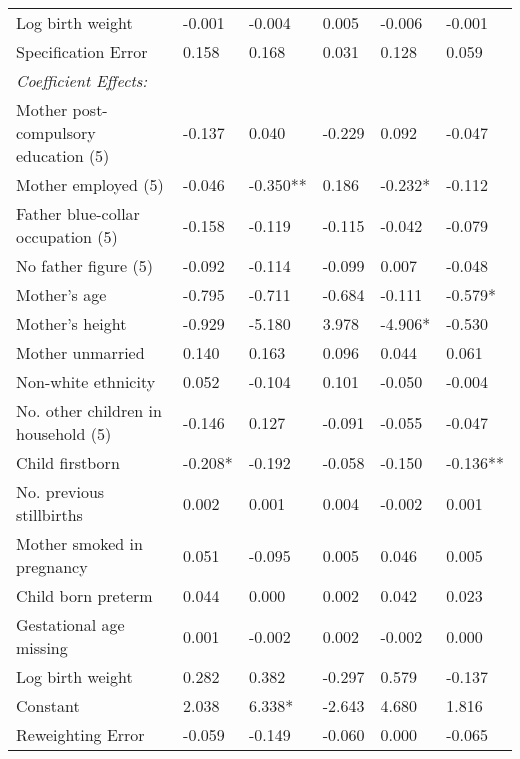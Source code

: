 \begin{table}[htbp]
\begin{tabular}{L{.3\textwidth}C{.085\textwidth}C{.085\textwidth}C{.085\textwidth}C{.085\textwidth}C{.085\textwidth}}
    Log birth weight & -0.001 & -0.004 & 0.005 & -0.006 & -0.001 \\
    Specification Error & 0.158 & 0.168 & 0.031 & 0.128 & 0.059 \\
    \textit{Coefficient Effects:} &       &       &       &       &  \\
    Mother post-compulsory education (5) & -0.137 & 0.040 & -0.229 & 0.092 & -0.047 \\
    Mother employed (5) & -0.046 & -0.350** & 0.186 & -0.232* & -0.112 \\
    Father blue-collar occupation (5) & -0.158 & -0.119 & -0.115 & -0.042 & -0.079 \\
    No father figure (5) & -0.092 & -0.114 & -0.099 & 0.007 & -0.048 \\
    Mother's age & -0.795 & -0.711 & -0.684 & -0.111 & -0.579* \\
    Mother's height & -0.929 & -5.180 & 3.978 & -4.906* & -0.530 \\
    Mother unmarried & 0.140 & 0.163 & 0.096 & 0.044 & 0.061 \\
    Non-white ethnicity & 0.052 & -0.104 & 0.101 & -0.050 & -0.004 \\
    No. other children in household (5) & -0.146 & 0.127 & -0.091 & -0.055 & -0.047 \\
    Child firstborn & -0.208* & -0.192 & -0.058 & -0.150 & -0.136** \\
    No. previous stillbirths & 0.002 & 0.001 & 0.004 & -0.002 & 0.001 \\
    Mother smoked in pregnancy & 0.051 & -0.095 & 0.005 & 0.046 & 0.005 \\
    Child born preterm & 0.044 & 0.000 & 0.002 & 0.042 & 0.023 \\
    Gestational age missing & 0.001 & -0.002 & 0.002 & -0.002 & 0.000 \\
    Log birth weight & 0.282 & 0.382 & -0.297 & 0.579 & -0.137 \\
    Constant & 2.038 & 6.338* & -2.643 & 4.680 & 1.816 \\
    Reweighting Error & -0.059 & -0.149 & -0.060 & 0.000 & -0.065 \\
    \bottomrule
    \end{tabular}%
\endgroup
{}
\end{table}

